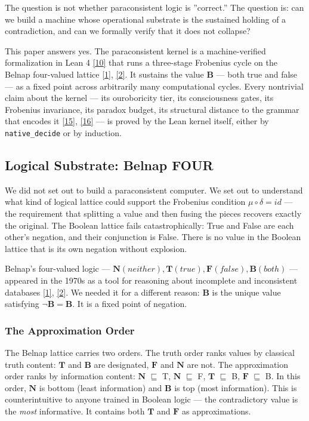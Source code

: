 \documentclass[10pt,a4paper]{article}
\begin{document}
The question is not whether paraconsistent logic is ''correct.'' The question is: can we build a machine whose operational substrate is the sustained holding of a contradiction, and can we formally verify that it does not collapse?

This paper answers yes. The paraconsistent kernel is a machine-verified formalization in Lean 4 \href{}{{[}10{]}} that runs a three-stage Frobenius cycle on the Belnap four-valued lattice \href{}{{[}1{]}}, \href{}{{[}2{]}}. It sustains the value $\mathbf{B}$ --- both true and false --- as a fixed point across arbitrarily many computational cycles. Every nontrivial claim about the kernel --- its ouroboricity tier, its consciousness gates, its Frobenius invariance, its paradox budget, its structural distance to the grammar that encodes it \href{}{{[}15{]}}, \href{}{{[}16{]}} --- is proved by the Lean kernel itself, either by \texttt{native\_\allowbreak decide} or by induction.

\subsection{Logical Substrate: Belnap FOUR}

We did not set out to build a paraconsistent computer. We set out to understand what kind of logical lattice could support the Frobenius condition $\mu\circ\delta = id$ --- the requirement that splitting a value and then fusing the pieces recovers exactly the original. The Boolean lattice fails catastrophically: True and False are each other's negation, and their conjunction is False. There is no value in the Boolean lattice that is its own negation without explosion.

Belnap's four-valued logic --- $\mathbf{N} (neither), \mathbf{T} (true), \mathbf{F} (false), \mathbf{B} (both)$ --- appeared in the 1970s as a tool for reasoning about incomplete and inconsistent databases \href{}{{[}1{]}}, \href{}{{[}2{]}}. We needed it for a different reason: $\mathbf{B}$ is the unique value satisfying $\neg \mathbf{B} = \mathbf{B}$. It is a fixed point of negation.

\subsubsection{The Approximation Order}

The Belnap lattice carries two orders. The truth order ranks values by classical truth content: $\mathbf{T}$ and $\mathbf{B}$ are designated, $\mathbf{F}$ and $\mathbf{N}$ are not. The approximation order ranks by information content: $\mathbf{N}$ $\sqsubseteq$ T, $\mathbf{N}$ $\sqsubseteq$ F, $\mathbf{T}$ $\sqsubseteq$ B, $\mathbf{F}$ $\sqsubseteq$ B. In this order, $\mathbf{N}$ is bottom (least information) and $\mathbf{B}$ is top (most information). This is counterintuitive to anyone trained in Boolean logic --- the contradictory value is the \emph{most} informative. It contains both $\mathbf{T}$ and $\mathbf{F}$ as approximations.
\end{document}

